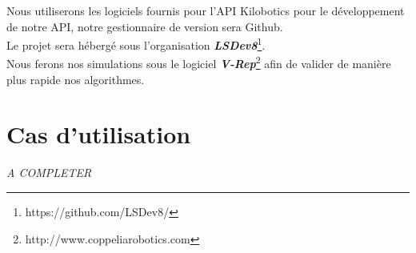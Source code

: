 \documentclass[a4paper,8pt]{report}
\begin{document}
Nous utiliserons les logiciels fournis pour l'API Kilobotics pour le d\'eveloppement de notre API, notre gestionnaire de version sera Github.\\
Le projet sera h\'eberg\'e sous l'organisation \textit{\textbf{LSDev8}}\footnote{https://github.com/LSDev8/}.\\
Nous ferons nos simulations sous le logiciel \textit{\textbf{V-Rep}}\footnote{http://www.coppeliarobotics.com} afin de valider de mani\`ere plus rapide nos algorithmes.\\

\section*{Cas d'utilisation}\label{sec:name}

\textit{A COMPLETER}
\end{document}
